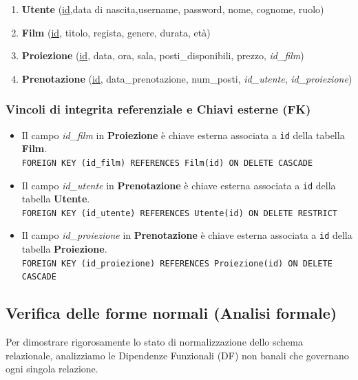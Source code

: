 \documentclass{article}
\begin{document}
\begin{enumerate}
    \item \textbf{Utente} (\underline{id},data di nascita,username, password, nome, cognome, ruolo)
    \item \textbf{Film} (\underline{id}, titolo, regista, genere, durata, età)
    \item \textbf{Proiezione} (\underline{id}, data, ora, sala, posti\_disponibili, prezzo, \textit{id\_film})
    \item \textbf{Prenotazione} (\underline{id}, data\_prenotazione, num\_posti, \textit{id\_utente}, \textit{id\_proiezione})
\end{enumerate}
\subsubsection{Vincoli di integrita referenziale e Chiavi esterne (FK)}
\begin{itemize}
    \item Il campo \textit{id\_film} in \textbf{Proiezione} è chiave esterna associata a \texttt{id} della tabella \textbf{Film}.\\
    \texttt{FOREIGN KEY (id\_film) REFERENCES Film(id) ON DELETE CASCADE}
    \item Il campo \textit{id\_utente} in \textbf{Prenotazione} è chiave esterna associata a \texttt{id} della tabella \textbf{Utente}.\\
    \texttt{FOREIGN KEY (id\_utente) REFERENCES Utente(id) ON DELETE RESTRICT}
    \item Il campo \textit{id\_proiezione} in \textbf{Prenotazione} è chiave esterna associata a \texttt{id} della tabella \textbf{Proiezione}.\\
    \texttt{FOREIGN KEY (id\_proiezione) REFERENCES Proiezione(id) ON DELETE CASCADE}
\end{itemize}
\subsection{Verifica delle forme normali (Analisi formale)}
Per dimostrare rigorosamente lo stato di normalizzazione dello schema relazionale, analizziamo le Dipendenze Funzionali (DF) non banali che governano ogni singola relazione.
\end{document}
